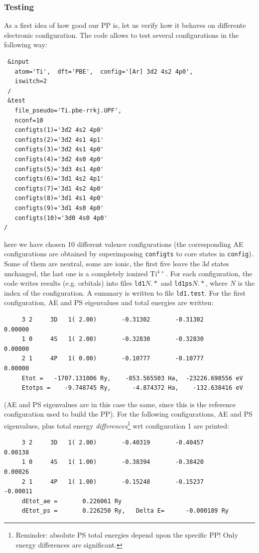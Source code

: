 \documentclass[12pt,a4paper]{article}
\begin{document}
\subsubsection{Testing}

As a first idea of how good our PP is, let us verify how it
behaves on differente electronic configuration. The code
allows to test several configurations in the following way:
\begin{verbatim}
 &input
   atom='Ti',  dft='PBE',  config='[Ar] 3d2 4s2 4p0',
   iswitch=2
 /
 &test
   file_pseudo='Ti.pbe-rrkj.UPF',
   nconf=10
   configts(1)='3d2 4s2 4p0'
   configts(2)='3d2 4s1 4p1'
   configts(3)='3d2 4s1 4p0'
   configts(4)='3d2 4s0 4p0'
   configts(5)='3d3 4s1 4p0'
   configts(6)='3d1 4s2 4p1'
   configts(7)='3d1 4s2 4p0'
   configts(8)='3d1 4s1 4p0'
   configts(9)='3d1 4s0 4p0'
   configts(10)='3d0 4s0 4p0'
/
\end{verbatim}
here we have chosen 10 different valence configurations 
(the corresponding AE configurations are obtained by 
superimposing \texttt{configts} to core states in \texttt{config}).
Some of them are neutral, some are ionic, the first five leave
the $3d$ states unchanged, the last one is a completely ionized
Ti$^{4+}$. For each configuration, the code writes results 
(e.g. orbitals) into files \texttt{ld1}$N.*$ and \texttt{ld1ps}$N.*$,
where $N$ is the index of the configuration. A summary is written to
file \texttt{ld1.test}. For the first configuration, AE and PS 
eigenvalues and total energies are written:
\begin{verbatim}
     3 2     3D   1( 2.00)       -0.31302       -0.31302        0.00000
     1 0     4S   1( 2.00)       -0.32830       -0.32830        0.00000
     2 1     4P   1( 0.00)       -0.10777       -0.10777        0.00000
     Etot =   -1707.131006 Ry,    -853.565503 Ha,  -23226.698556 eV
     Etotps =    -9.748745 Ry,      -4.874372 Ha,    -132.638416 eV
\end{verbatim}
(AE and PS eigenvalues are in this case the same, since this is the
reference configuration used to build the PP). For the following
configurations, AE and PS eigenvalues, plus total energy
{\em differences}\footnote{Reminder: absolute PS total energies 
depend upon the specific PP! Only energy differences are significant.}
wrt configuration 1 are printed:
\begin{verbatim}
     3 2     3D   1( 2.00)       -0.40319       -0.40457        0.00138
     1 0     4S   1( 1.00)       -0.38394       -0.38420        0.00026
     2 1     4P   1( 1.00)       -0.15248       -0.15237       -0.00011
     dEtot_ae =       0.226061 Ry
     dEtot_ps =       0.226250 Ry,   Delta E=      -0.000189 Ry
\end{verbatim}
\end{document}
